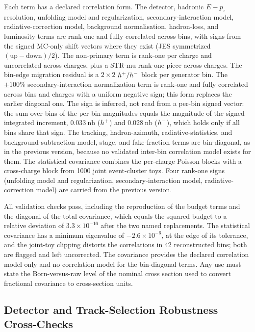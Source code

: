 Each term has a declared correlation form.  The detector, hadronic $E-p_z$ resolution,
unfolding model and regularization, secondary-interaction model, radiative-correction model,
background normalisation, hadron-loss, and luminosity terms are rank-one
and fully correlated across bins, with signs from the signed MC-only shift
vectors where they exist (JES symmetrized $(\mathrm{up}-\mathrm{down})/2$).
The non-primary term is rank-one per charge and uncorrelated across charges, plus a
STR-mu rank-one piece across charges.  The bin-edge migration residual is a $2\times2$
$h^{+}/h^{-}$ block per generator bin.
The $\pm100\%$ secondary-interaction normalization term is rank-one and fully
correlated across bins and charges with a uniform negative sign; this form
replaces the earlier diagonal one.  The sign is inferred, not
read from a per-bin signed vector: the sum over bins of the per-bin magnitudes
equals the magnitude of the signed integrated increment, $0.033~\mathrm{nb}$
($h^{+}$) and $0.028~\mathrm{nb}$ ($h^{-}$), which holds only if all bins share
that sign.  The tracking, hadron-azimuth, radiative-statistics, and
background-subtraction model, stage, and fake-fraction terms are bin-diagonal, as in
the previous version, because no validated inter-bin correlation model exists for them.
The statistical covariance combines the per-charge Poisson blocks with a
cross-charge block from 1000 joint event-cluster toys.  Four rank-one signs
(unfolding model and regularization, secondary-interaction model, radiative-correction model)
are carried from the previous version.

All validation checks pass, including the reproduction of the
budget terms and the diagonal of the total covariance, which equals the squared
budget to a relative deviation of $3.3\times10^{-16}$ after the two named
replacements.  The statistical covariance has a minimum eigenvalue of
$-2.6\times10^{-6}$, at the edge of its tolerance, and the joint-toy
clipping distorts the correlations in 42 reconstructed bins; both are flagged
and left uncorrected.  The covariance provides the declared correlation model only and
no correlation model for the bin-diagonal terms.  Any use must state the
Born-versus-raw level of the nominal cross section used to convert fractional
covariance to cross-section units.

\subsection{Detector and Track-Selection Robustness Cross-Checks}
\label{sec:syst:cut-variations}

